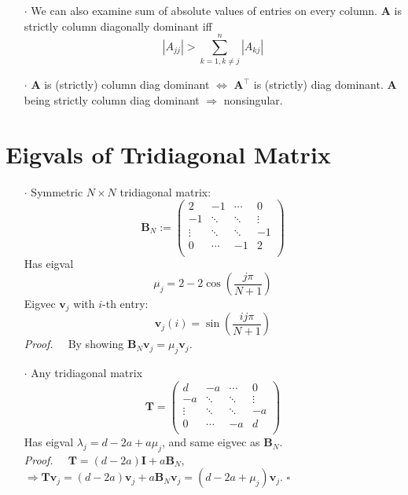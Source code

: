 \documentclass[a4paper, 11pt]{article}
\begin{document}
\begin{itemize}
  \item[$\cdot$] We can also examine sum of absolute values of entries on every column. $\bm{A}$ is strictly column diagonally dominant iff 
  $$
  |A_{jj}| > \sum_{k=1, k\ne j}^n |A_{kj}|
  $$
  \item[$\cdot$] $\bm{A}$ is (strictly) column diag dominant $\iff$ $\bm{A}^{\top}$ is (strictly) diag dominant. $\bm{A}$ being strictly column diag dominant $\Rightarrow$ nonsingular.
\end{itemize}


\section{Eigvals of Tridiagonal Matrix}
\begin{itemize}
  \item[$\cdot$] Symmetric $N\times N$ tridiagonal matrix:
  $$\bm{B}_N:=
  \begin{pmatrix}
    2 & -1 & \cdots & 0 \\
    -1 & \ddots & \ddots & \vdots \\
    \vdots & \ddots & \ddots & -1 \\
    0 & \cdots & -1 & 2 \\
  \end{pmatrix}
  $$
  Has eigval
  $$
  \mu_j = 2 - 2 \cos\left(\frac{j\pi}{N+1}\right)
  $$
  Eigvec $\bm{v}_j$ with $i$-th entry:
  $$
  \bm{v}_j(i) = \sin\left(\frac{ij\pi}{N+1}\right)
  $$
  \textit{Proof.~~} By showing $\bm{B}_N \bm{v}_j = \mu_j \bm{v}_j$.
  \item[$\cdot$] Any tridiagonal matrix
  $$
  \bm{T}=
  \begin{pmatrix}
    d & -a & \cdots & 0 \\
    -a & \ddots & \ddots & \vdots \\
    \vdots & \ddots & \ddots & -a \\
    0 & \cdots & -a & d \\
  \end{pmatrix}
  $$
  Has eigval $\lambda_j = d-2a+a\mu_j$, and same eigvec as $\bm{B}_N$.\\
  \textit{Proof.~~} $\bm{T} = (d-2a)\bm{I}+a \bm{B}_N$, $\Rightarrow \bm{T}\bm{v}_j = (d-2a)\bm{v}_j + a \bm{B}_N \bm{v}_j = (d-2a+\mu_j) \bm{v}_j$. $\square$
\end{itemize}
\end{document}
